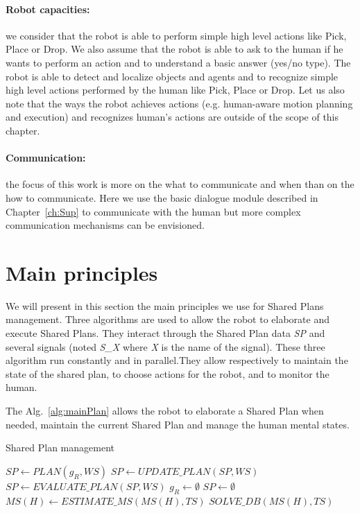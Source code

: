 \documentclass[english,a4paper,11pt,twoside]{StyleThese}
\begin{document}
\paragraph{Robot capacities:} we consider that the robot is able to perform simple high level actions like Pick, Place or Drop. We also assume that the robot is able to ask to the human if he wants to perform an action and to understand a basic answer (yes/no type). 
The robot is able to detect and localize objects and agents
and to recognize simple high level actions performed by the human like Pick, Place or Drop. Let us also note that the ways the robot achieves actions (e.g. human-aware motion planning and execution) and recognizes human's actions are outside of the scope of this chapter.

\paragraph{Communication:} the focus of this work is more on the what to communicate and when than on the how to communicate. Here we use the basic dialogue module described in Chapter~\ref{ch:Sup} to communicate with the human but more complex communication mechanisms can be envisioned. 

\section{Main principles}

We will present in this section the main principles we use for Shared Plans management. Three algorithms are used to allow the robot to elaborate and execute Shared Plans.  They interact through the Shared Plan data \textit{SP} and several signals (noted \textit{S\_X} where \textit{X} is the name of the signal). These three algorithm run constantly and in parallel.They allow respectively to maintain the state of the shared plan, to choose actions for the robot, and to monitor the human.

The Alg.~\ref{alg:mainPlan} allows the robot to elaborate a Shared Plan when needed, maintain the current Shared Plan and manage the human mental states.

\begin{algorithm}
\caption{Shared Plan management}
\label{alg:mainPlan}
\begin{algorithmic}
\STATE $SP \leftarrow PLAN(g_R, WS)$
\ENDIF
{}
\STATE $SP \leftarrow UPDATE\_PLAN(SP, WS)$
\ENDIF
{}
\STATE $SP \leftarrow EVALUATE\_ PLAN(SP, WS)$
\ENDIF
{}
\STATE $g_R \leftarrow \emptyset$ 
\STATE $SP \leftarrow \emptyset$
\ENDIF
{}
\STATE $MS(H) \leftarrow ESTIMATE\_MS(MS(H), TS)$
\STATE $SOLVE\_DB(MS(H), TS)$
\ENDIF
\ENDIF
\ENDWHILE
\end{algorithmic}
\end{algorithm} 
\end{document}
